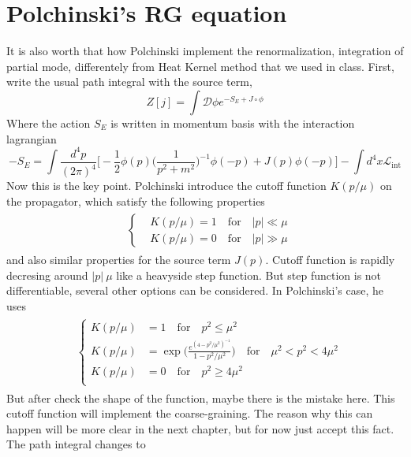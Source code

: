 \documentclass[12pt,halfline,a4paper]{ouparticle}
\begin{document}
\section{Polchinski's RG equation}
It is also worth that how Polchinski implement the renormalization, integration of partial mode, differentely from Heat Kernel method that we used in class.
First, write the usual path integral with the source term,
\begin{equation}
	Z[j]=\int\mathcal D \phi e^{-S_E+J\circ\phi}
\end{equation}
Where the action $S_E$ is written in momentum basis with the interaction lagrangian
\begin{equation}
	-S_E=\int \frac{d^4p}{(2\pi)^4}\big[-\frac{1}{2}\phi(p)\bigg(\frac{1}{p^2+m^2}\bigg)^{-1}\phi(-p)+J(p)\phi(-p)\bigg]-\int d^4x \mathcal L_\text{int}
\end{equation}
Now this is the key point. Polchinski introduce the cutoff function $K(p/\mu)$ on the propagator, which satisfy the following properties
\begin{align}\begin{split}
	&\left\{
	\begin{aligned}
		&K(p/\mu)=1\quad\text{for}\quad |p|\ll\mu\\
		&K(p/\mu)=0\quad\text{for}\quad |p|\gg\mu
	\end{aligned}
	\right.
\end{split}\end{align}
and also similar properties for the source term $J(p)$.
Cutoff function is rapidly decresing around $|p|~\mu$ like a heavyside step function. But step function is not differentiable, several other options can be considered.
In Polchinski's case, he uses
\begin{align}\begin{split}
	&\left\{
		\begin{aligned}
	K(p/\mu)&=1\quad \text{for} \quad p^2\leq\mu^2\\
	K(p/\mu)&=\exp\big(\frac{e^{(4-p^2/\mu^2)^{-1}}}{1-p^2/\mu^2}\big)\quad \text{for} \quad \mu^2<p^2<4\mu^2\\
	K(p/\mu)&=0\quad \text{for} \quad p^2\geq 4\mu^2\\
\end{aligned}
\right.
\end{split}\end{align}
But after check the shape of the function, maybe there is the mistake here. This cutoff function will implement the coarse-graining. The reason why this can happen will be more clear in the next chapter, but for now just accept this fact. The path integral changes to
\end{document}
